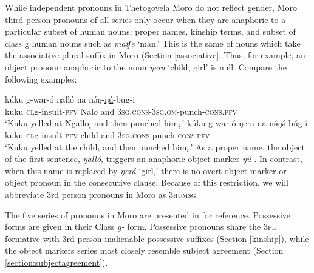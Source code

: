 While independent pronouns in Thetogovela Moro do not reflect gender, Moro third person pronouns of all series only occur when they are anaphoric to a particular subset of human nouns: proper names, kinship terms, and subset of class g human nouns such as \textit{matʃe} `man.' This is the same of nouns which take the associative plural suffix in Moro (Section \ref{associative}. Thus, for example, an object pronoun anaphoric to the noun \textit{ŋera} `child, girl' is null. Compare the following examples:

\ea	
	\ea  \gll kúku g-war-ó ŋalló na nə́ŋ-\underline{ŋú}-bug-i\\
		kuku \textsc{cl}g-insult-\textsc{pfv} Nalo and \textsc{3sg.cons}-\textsc{3sg.om}-punch-\textsc{cons.pfv}\\
		\glt `Kuku yelled at Ngallo$_i$ and then punched him$_i$.'
	\ex \gll kúku g-war-ó ŋera na nə́ŋə́-búg-í\\
			kuku \textsc{cl}g-insult-\textsc{pfv} child and \textsc{3sg.cons}-punch-\textsc{cons.pfv}\\
		\glt `Kuku yelled at the child$_i$ and then punched him$_i$.'
	\z
\z 
As a proper name, the object of the first sentence, \textit{ŋalló}, triggers an anaphoric object marker \textit{ŋú-}. In contrast, when this name is replaced by \textit{ŋerá} `girl,' there is no overt object marker or object pronoun in the consecutive clause. Because of this restriction, we will abbreviate 3rd person pronouns in Moro as \textsc{3humsg}. %

The five series of pronouns in Moro are presented in  for reference. Possessive forms are given in their Class \textit{g-} form. Possessive pronouns share the 3\textsc{pl} formative with 3rd person inalienable possessive suffixes (Section \ref{kinship}), while the object markers series most closely resemble subject agreement (Section \ref{section:subjectagreement}).

